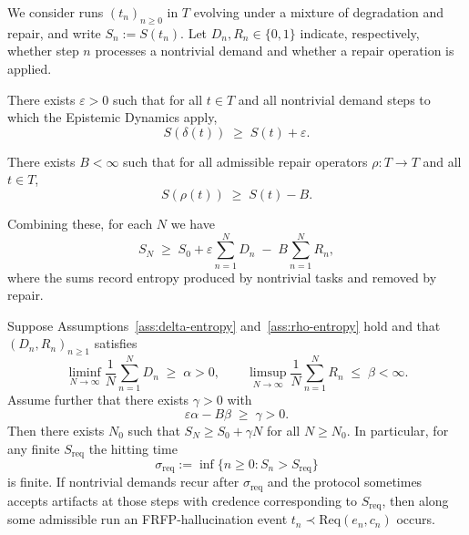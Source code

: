 We consider runs $(t_n)_{n \ge 0}$ in $T$ evolving under a mixture of degradation and repair, and
write $S_n := S(t_n)$. Let $D_n,R_n \in \{0,1\}$ indicate, respectively, whether step $n$ processes a
nontrivial demand and whether a repair operation is applied.

\begin{assumption}\label{ass:delta-entropy}
There exists $\varepsilon > 0$ such that for all $t \in T$ and all nontrivial demand steps to which the
Epistemic Dynamics apply,
\[
  S(\delta(t)) \;\ge\; S(t) + \varepsilon.
\]
\end{assumption}

\begin{assumption}\label{ass:rho-entropy}
There exists $B < \infty$ such that for all admissible repair operators $\rho : T \to T$ and all
$t \in T$,
\[
  S(\rho(t)) \;\ge\; S(t) - B.
\]
\end{assumption}

Combining these, for each $N$ we have
\begin{equation}\label{eq:Sn-balance}
  S_N \;\ge\; S_0 + \varepsilon \sum_{n=1}^N D_n \;-\; B \sum_{n=1}^N R_n,
\end{equation}
where the sums record entropy produced by nontrivial tasks and removed by repair.
\begin{theorem}\label{thm:delta-rho-deterministic}
Suppose Assumptions~\ref{ass:delta-entropy} and~\ref{ass:rho-entropy} hold and that
$(D_n,R_n)_{n \ge 1}$ satisfies
\[
  \liminf_{N \to \infty} \frac{1}{N}\sum_{n=1}^N D_n \;\ge\; \alpha > 0,
  \qquad
  \limsup_{N \to \infty} \frac{1}{N}\sum_{n=1}^N R_n \;\le\; \beta < \infty.
\]
Assume further that there exists $\gamma > 0$ with
\[
  \varepsilon \alpha - B \beta \;\ge\; \gamma > 0.
\]
Then there exists $N_0$ such that $S_N \ge S_0 + \gamma N$ for all $N \ge N_0$. In particular, for
any finite $S_{\mathrm{req}}$ the hitting time
\[
  \sigma_{\mathrm{req}} := \inf\{n \ge 0 : S_n > S_{\mathrm{req}}\}
\]
is finite. If nontrivial demands recur after $\sigma_{\mathrm{req}}$ and the protocol sometimes accepts
artifacts at those steps with credence corresponding to $S_{\mathrm{req}}$, then along some admissible
run an FRFP-hallucination event $t_n \prec \mathrm{Req}(e_n,c_n)$ occurs.
\end{theorem}

